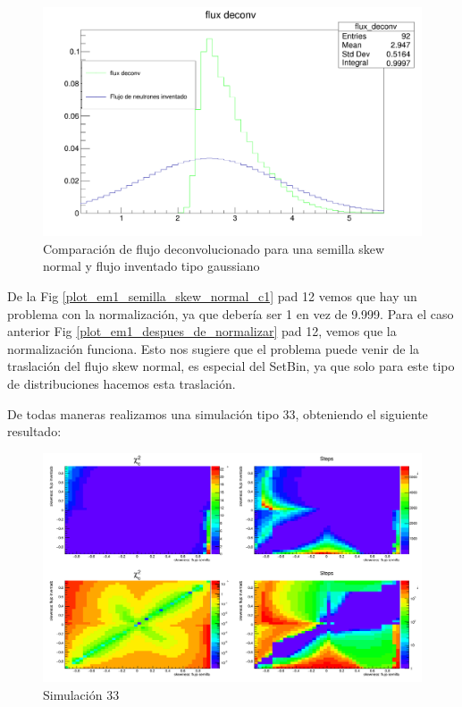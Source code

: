 \documentclass[11pt,letterpaper]{article}
\begin{document}
\begin{figure}[H]
    \includegraphics[width=1.\textwidth]{img/em1_semilla_skew_normal_c2.png}
    \centering
     \cprotect\caption{Comparación de flujo deconvolucionado para una semilla skew normal y flujo inventado tipo gaussiano} 
\label{plot_em1_semilla_skew_normal_c2}
\end{figure}

De la Fig \ref{plot_em1_semilla_skew_normal_c1} pad 12 vemos que hay un problema con la normalización, ya que debería ser 1 en vez de 9.999. Para el caso anterior Fig \ref{plot_em1_despues_de_normalizar} pad 12, vemos que la normalización funciona. Esto nos sugiere que el problema puede venir de la traslación del flujo skew normal, es especial del SetBin, ya que solo para este tipo de distribuciones hacemos esta traslación.

De todas maneras realizamos una simulación tipo 33, obteniendo el siguiente resultado:

\begin{figure}[H]
    \includegraphics[width=1.\textwidth]{img/plot_deconv_33_shift.png}
    \centering
     \cprotect\caption{Simulación 33} 
\label{plot_deconv_33_shift}
\end{figure}
\end{document}
